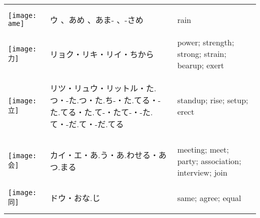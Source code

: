 \documentclass[a4paper,12pt]{extarticle}
\begin{document}
\begin{longtable}{|lp{6cm}p{4cm}|}
\begin{minipage}{0.3\textwidth}
\centerline{
	\texttt{[image: ame]}
}
\end{minipage}
&
\begin{CJK}{UTF8}{min} ウ 、あめ 、あま- 、-さめ\end{CJK}
&
 rain
\\ 
\begin{minipage}{0.3\textwidth}
\centerline{
	\texttt{[image: 力]}
}
\end{minipage}
&
\begin{CJK}{UTF8}{min}リョク・リキ・リイ・ちから\end{CJK}
&
power; strength; strong; strain; bearup; exert
\\ 
\begin{minipage}{0.3\textwidth}
\centerline{
	\texttt{[image: 立]}
}
\end{minipage}
&
\begin{CJK}{UTF8}{min}リツ・リュウ・リットル・た.つ・-た.つ・た.ち-・た.てる・-た.てる・た.て-・たて-・-た.て・-だ.て・-だ.てる\end{CJK}
&
standup; rise; setup; erect
\\ 
\begin{minipage}{0.3\textwidth}
\centerline{
	\texttt{[image: 会]}
}
\end{minipage}
&
\begin{CJK}{UTF8}{min}カイ・エ・あ.う・あ.わせる・あつ.まる\end{CJK}
&
meeting; meet; party; association; interview; join
\\ 
\begin{minipage}{0.3\textwidth}
\centerline{
	\texttt{[image: 同]}
}
\end{minipage}
&
\begin{CJK}{UTF8}{min}ドウ・おな.じ\end{CJK}
&
same; agree; equal
\\ 

\end{longtable}
\end{document}
